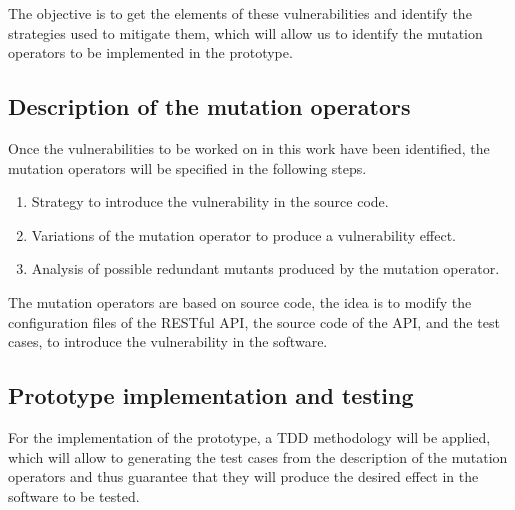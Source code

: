 The objective is to get the elements of these vulnerabilities and identify the strategies used to mitigate them, which will allow us to identify the mutation operators to be implemented in the prototype.

\subsection{Description of the mutation operators}

Once the vulnerabilities to be worked on in this work have been identified, the mutation operators will be specified in the following steps.

\begin{enumerate}
    \item Strategy to introduce the vulnerability in the source code.
    \item Variations of the mutation operator to produce a vulnerability effect.
    \item Analysis of possible redundant mutants produced by the mutation operator.
\end{enumerate}

The mutation operators are based on source code, the idea is to modify the configuration files of the RESTful API, the source code of the API, and the test cases, to introduce the vulnerability in the software. 

\subsection{Prototype implementation and testing}

For the implementation of the prototype, a TDD methodology\cite{williams2003test} will be applied, which will allow to generating the test cases from the description of the mutation operators and thus guarantee that they will produce the desired effect in the software to be tested.
